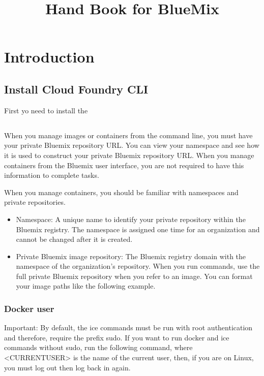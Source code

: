 \documentclass[]{book}
\title{Hand Book for BlueMix }
\author{}
\begin{document}
\maketitle


\chapter{Introduction}

\section{Install Cloud Foundry CLI}

First yo need to install the 

\section{}

When you manage images or containers from the command line, you must have your private Bluemix repository URL. You can view your namespace and see how it is used to construct your private Bluemix repository URL. When you manage containers from the Bluemix user interface, you are not required to have this information to complete tasks.

When you manage containers, you should be familiar with namespaces and private repositories.
\begin{itemize}

\item Namespace: A unique name to identify your private repository within the Bluemix registry. The namespace is assigned one time for an organization and cannot be changed after it is created.
\item Private Bluemix image repository: The Bluemix registry domain with the namespace of the organization's repository. When you run commands, use the full private Bluemix repository when you refer to an image. You can format your image paths like the following example.
\end{itemize}


\subsection{Docker user}
Important: By default, the ice commands must be run with root authentication and therefore, require the prefix sudo. If you want to run docker and ice commands without sudo, run the following command, where <CURRENTUSER> is the name of the current user, then, if you are on Linux, you must log out then log back in again.
\end{document}
